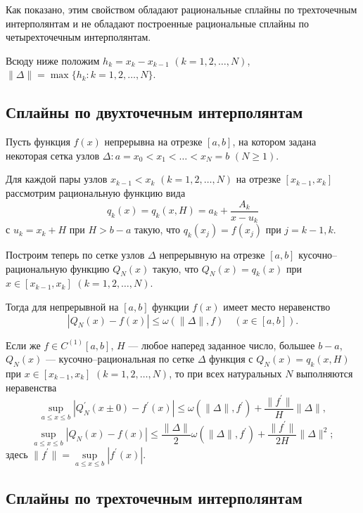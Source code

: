 Как показано, этим свойством обладают рациональные сплайны по трехточечным интерполянтам
и не обладают построенные рациональные сплайны по четырехточечным интерполянтам.

Всюду ниже положим $h_k=x_k-x_{k-1}$ $(k=1,2,\dots,N)$, $\|\Delta\|=\max\{h_k:k=1,2,\dots,N\}$.

\subsection{Сплайны по двухточечным интерполянтам}

Пусть функция $f(x)$ непрерывна на отрезке $[a,b]$, на котором задана некоторая сетка узлов
$\Delta: a=x_0<x_1<\dots<x_N=b$ $(N\geqslant 1)$.

Для каждой пары узлов $x_{k-1}<x_k$ $(k=1,2,\dots,N)$ на отрезке $[x_{k-1}, x_k]$
рассмотрим рациональную функцию вида
\begin{equation}\label{1.1}
q_k(x)=q_k(x,H)=a_k+\frac{A_k}{x-u_k}
\end{equation}
с $u_k=x_k+H$ при $H>b-a$ такую, что $q_k(x_j)=f(x_j)$ при $j=k-1,k$.


Построим теперь по сетке узлов $\Delta$  непрерывную на отрезке $[a,b]$ кусочно--ра\-циональную
функцию $Q_N(x)$ такую, что $Q_N(x)=q_k(x)$ при $x\in [x_{k-1}, x_k]$ $(k=1,2,\dots, N)$.

Тогда для непрерывной на $[a,b]$ функции $f(x)$ имеет место неравенство
\begin{equation}\label{1.4}
|Q_N(x)-f(x)|\leqslant \omega (\|\Delta\|, f)\quad (x\in [a,b]).
\end{equation}


Если же  $f\in C^{(1)}[a,b]$, $H$ ---
любое наперед заданное число, большее $b-a$, $Q_N(x)$ --- кусочно--рациональная по сетке
$\Delta$ функция с $Q_N(x)=q_k(x, H)$ при $x\in [x_{k-1}, x_k]$ $(k=1,2,\dots,N)$, то
при всех натуральных $N$ выполняются неравенства
$$
\sup_{a\leqslant x\leqslant b} |Q_N^\prime (x\pm 0)-f^\prime (x)|\leqslant
 \omega (\|\Delta\|, f^\prime)+\frac{\|f^\prime\|}{H}\|\Delta\|,
$$
$$
\sup_{a\leqslant x\leqslant b} |Q_N (x)-f (x)|\leqslant
\frac{\|\Delta\|} 2 \omega (\|\Delta\|, f^\prime)+\frac{\|f^\prime\|}{2H}\|\Delta\|^2;
$$
здесь $\|f^\prime\|=\sup\limits_{a\leqslant x\leqslant b}|f^\prime(x)|$.

\subsection{Сплайны по трехточечным интерполянтам}


